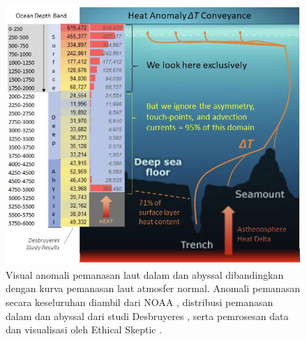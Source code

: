 \documentclass[10pt,twocolumn,letterpaper]{article}
\begin{document}
\begin{figure}[t]
\begin{center}
\includegraphics[width=1\textwidth]{deepsea.jpg}
\end{center}
   \caption{Visual anomali pemanasan laut dalam dan abyssal dibandingkan dengan kurva pemanasan laut atmosfer normal. Anomali pemanasan secara keseluruhan diambil dari NOAA \cite{147}, distribusi pemanasan dalam dan abyssal dari studi Desbruyeres \cite{132}, serta pemrosesan data dan visualisasi oleh Ethical Skeptic \cite{129}.}
\label{fig:21}
\end{figure}
\end{document}
